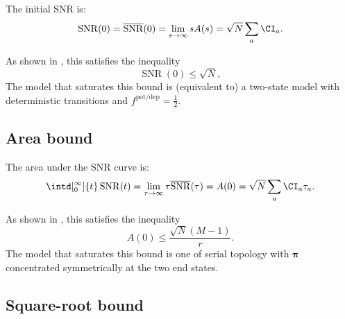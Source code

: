 \documentclass[12pt]{article}
\newcommand{\aav}[1]{\mathopen{}\left\lAngle #1 \right\rAngle\mathclose{}}
\newcommand{\nnrm}[1]{\mathopen{}\left\lVvert #1 \right\rVvert\mathclose{}}
\newcommand{\eqm}{\pi}
\newcommand{\eq}{\boldsymbol{\eqm}}
\newcommand{\potdep}{^{\text{pot/dep}}}
\DeclareMathOperator{\snr}{SNR}
\newcommand{\snrb}{\overline{\snr}}
\begin{document}
The initial SNR is:
%
\begin{equation}\label{eq:initdef}
  \snr(0) = \snrb(0) = \lim_{s\to\infty} sA(s)
      = \sqrt{N} \sum_a \CI_a.
\end{equation}
%

As shown in \cite{Lahiri2013synapse}, this satisfies the inequality
%
\begin{equation}\label{eq:initbnd}
  \snr(0) \leq \sqrt{N},
\end{equation}
%
The model that saturates this bound is (equivalent to) a two-state model with deterministic transitions and $f\potdep=\frac{1}{2}$.


\subsection{Area bound}\label{sec:area}

The area under the SNR curve is:
%
\begin{equation}\label{eq:areadef}
  \intd[_0^\infty]{t} \snr(t) = \lim_{\tau\to\infty} \tau \snrb(\tau) 
      = A(0) = \sqrt{N} \sum_a \CI_a \tau_a.
\end{equation}
%

As shown in \cite{Lahiri2013synapse}, this satisfies the inequality
%
\begin{equation}\label{eq:areabnd}
  A(0) \leq \frac{\sqrt{N}(M-1)}{r}.
\end{equation}
%
The model that saturates this bound is one of serial topology with $\eq$ concentrated symmetrically at the two end states.




\subsection{Square-root bound}\label{sec:sqrt}

\end{document}
